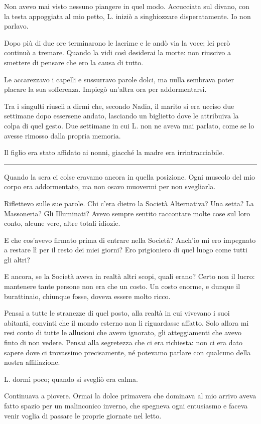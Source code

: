 \documentclass[a4paper,10pt]{memoir}
\begin{document}
Non avevo mai visto nessuno piangere in quel modo. Accucciata sul divano, con la testa appoggiata al mio petto, L.
iniziò a singhiozzare disperatamente. Io non parlavo.

Dopo più di due ore terminarono le lacrime e le andò via la voce; lei però continuò a tremare. Quando la vidi così
desiderai la morte: non riuscivo a smettere di pensare che ero la causa di tutto.

Le accarezzavo i capelli e sussurravo parole dolci, ma nulla sembrava poter placare la sua sofferenza. Impiegò un'altra
ora per addormentarsi.

Tra i singulti riuscii a dirmi che, secondo Nadia, il marito si era ucciso due settimane dopo essersene andato,
lasciando un biglietto dove le attribuiva la colpa di quel gesto. Due settimane in cui L. non ne aveva mai parlato, come
se lo avesse rimosso dalla propria memoria.

Il figlio era stato affidato ai nonni, giacché la madre era irrintracciabile.

\plainbreak{1}

Quando la sera ci colse eravamo ancora in quella posizione. Ogni muscolo del mio corpo era addormentato, ma non osavo
muovermi per non svegliarla.

Riflettevo sulle sue parole. Chi c'era dietro la Società Alternativa? Una setta? La Massoneria? Gli Illuminati? Avevo
sempre sentito raccontare molte cose sul loro conto, alcune vere, altre totali idiozie.

E che cos'avevo firmato prima di entrare nella Società? Anch'io mi ero impegnato a restare lì per il resto dei miei
giorni? Ero prigioniero di quel luogo come tutti gli altri?

E ancora, se la Società aveva in realtà altri scopi, quali erano? Certo non il lucro: mantenere tante persone non era
che un costo. Un costo enorme, e dunque il burattinaio, chiunque fosse, doveva essere molto ricco.

Pensai a tutte le stranezze di quel posto, alla realtà in cui vivevano i suoi abitanti, convinti che il mondo esterno
non li riguardasse affatto. Solo allora mi resi conto di tutte le allusioni che avevo ignorato, gli atteggiamenti che
avevo finto di non vedere. Pensai alla segretezza che ci era richiesta: non ci era dato sapere dove ci trovassimo
precisamente, né potevamo parlare con qualcuno della nostra affiliazione.

L. dormì poco; quando si svegliò era calma.

Continuava a piovere. Ormai la dolce primavera che dominava al mio arrivo aveva fatto spazio per un malinconico inverno,
che spegneva ogni entusiasmo e faceva venir voglia di passare le proprie giornate nel letto.
\end{document}
